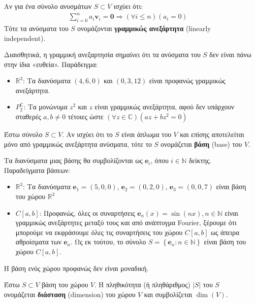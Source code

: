 \documentclass[main.tex]{subfiles}
\begin{document}
	\begin{definition}
		Αν για ένα σύνολο ανυσμάτων $S \subset V$ ισχύει ότι:
		\begin{align*}
			\sum_{i=0}^na_i\boldsymbol{v}_i = \boldsymbol{0} \Rightarrow (\forall i \leq n)(a_i = 0)
		\end{align*}
		Τότε τα ανύσματα του $S$ ονομάζονται \textbf{γραμμικώς ανεξάρτητα} (linearly independent).
	\end{definition}

	Διαισθητικά, η γραμμική ανεξαρτησία σημαίνει ότι τα ανύσματα του $S$ δεν είναι πάνω στην ίδια «ευθεία».
	Παράδειγμα:
	\begin{itemize}
		\item $\mathbb{R}^3$: Τα διανύσματα $(4, 6, 0)$ και $(0, 3, 12)$ είναι προφανώς γραμμικώς ανεξάρτητα. 
		\item $P^\mathbb{C}_2$: Τα μονώνυμα $z^2$ και $z$ είναι γραμμικώς ανεξάρτητα, αφού δεν υπάρχουν σταθερές ${a,b \neq 0}$ τέτοιες ώστε $(\forall z \in \mathbb{C})(az + bz^2 = 0)$
	\end{itemize}
	
	\begin{definition}
		Έστω σύνολο ${S \subset V}$. Αν ισχύει ότι το $S$ είναι άπλωμα του $V$ και επίσης αποτελείται μόνο από γραμμικώς ανεξάρτητα ανύσματα, τότε το $S$ ονομάζεται \textbf{βάση} (base) του $V$.
	\end{definition}
	Τα διανύσματα μιας βάσης θα συμβολίζονται ως $\boldsymbol{e}_i$, όπου $i \in \mathbb{N}$ δείκτης.\\
	Παραδείγματα βάσεων:
	\begin{itemize}
		\item $\mathbb{R}^3$: Τα διανύσματα $\boldsymbol{e}_1 = (5, 0, 0)$, $\boldsymbol{e}_2 = (0, 2, 0)$, $\boldsymbol{e}_3 = (0, 0, 7)$ είναι βάση του χώρου $\mathbb{R}^3$
		\item $C[a,b]$: Προφανώς, όλες οι συναρτήσεις $\boldsymbol{e}_n(x) = \sin(nx), n\in \mathbb{N}$ είναι γραμμικώς ανεξάρτητες μεταξύ τους και από ανάπτυγμα Fourier, ξέρουμε ότι μπορούμε να εκφράσουμε όλες τις συναρτήσεις του χώρου $C[a,b]$ ως άπειρα αθροίσματα των $\boldsymbol{e}_n$. Ως εκ τούτου, το σύνολο $S = \left\{\boldsymbol{e}_n : n \in \mathbb{N}\right\}$ είναι βάση του χώρου $C[a,b]$.
	\end{itemize}
	Η βάση ενός χώρου προφανώς δεν είναι μοναδική.
	
	\newpage
	
	\begin{definition}
		Έστω ${S \subset V}$ βάση του χώρου $V$. Η πληθικότητα (ή πληθάριθμος) $|S|$ του $S$ ονομάζεται \textbf{διάσταση} (dimension) του χώρου $V$ και συμβολίζεται $\dim(V)$.
	\end{definition}
	
\end{document}
